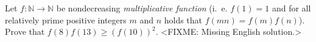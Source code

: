 \problem{}
Let $f \colon \mathbb{N} \to \mathbb{N}$ be nondecreasing
\emph{multiplicative function}
(i.~e. $f(1) = 1$ and for all relatively prime positive integers $m$ and $n$
holds that $f(m n) = f(m) f(n)$).
Prove that $f(8) f(13) \geq (f(10))^2$.
\solution
<FIXME: Missing English solution.>
\endproblem
